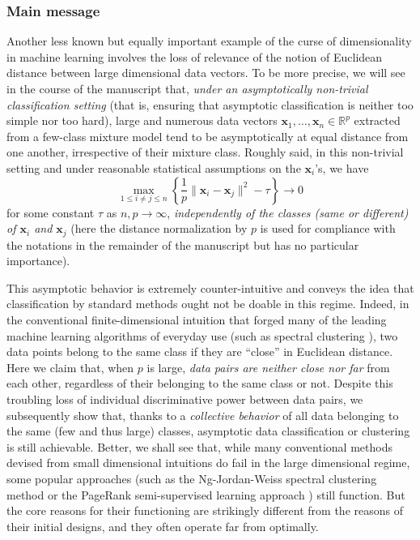 \documentclass[MAL,biber]{nowfnt} %
\newcommand{\x}{{\mathbf{x}}}
\newcommand{\RR}{{\mathbb{R}}}
\begin{document}
\subsubsection{Main message}

Another less known but equally important example of the curse of dimensionality in machine learning involves the loss of relevance of the notion of Euclidean distance between large dimensional data vectors. To be more precise, we will see in the course of the manuscript that, \emph{under an asymptotically non-trivial classification setting} (that is, ensuring that asymptotic classification is neither too simple nor too hard), large and numerous data vectors $\x_1,\ldots,\x_n\in\RR^p$ extracted from a few-class mixture model tend to be asymptotically at equal distance from one another, irrespective of their mixture class. Roughly said, in this non-trivial setting and under reasonable statistical assumptions on the $\x_i$'s, we have
\begin{equation}\label{eq:distance-constant}
    \max_{1\leq i\neq j\leq n} \left\{ \frac1p\| \x_i - \x_j \|^2 - \tau \right\} \to 0
\end{equation}
for some constant $\tau$ as $n,p\to\infty$, \emph{independently of the classes (same or different) of $\x_i$ and $\x_j$} (here the distance normalization by $p$ is used for compliance with the notations in the remainder of the manuscript but has no particular importance).

This asymptotic behavior is extremely counter-intuitive and conveys the idea that classification by standard methods ought not be doable in this regime. Indeed, in the conventional finite-dimensional intuition that forged many of the leading machine learning algorithms of everyday use (such as spectral clustering \citep{ng2002spectral,von2007tutorial}), two data points belong to the same class if they are ``close'' in Euclidean distance. Here we claim that, when $p$ is large, \emph{data pairs are neither close nor far} from each other, regardless of their belonging to the same class or not. Despite this troubling loss of individual discriminative power between data pairs, we subsequently show that, thanks to a \emph{collective behavior} of all data belonging to the same (few and thus large) classes, asymptotic data classification or clustering is still achievable. Better, we shall see that, while many conventional methods devised from small dimensional intuitions do fail in the large dimensional regime, some popular approaches (such as the Ng-Jordan-Weiss spectral clustering method \citep{ng2002spectral} or the PageRank semi-supervised learning approach \citep{avrachenkov2012generalized}) still function. But the core reasons for their functioning are strikingly different from the reasons of their initial designs, and they often operate far from optimally.
\end{document}
